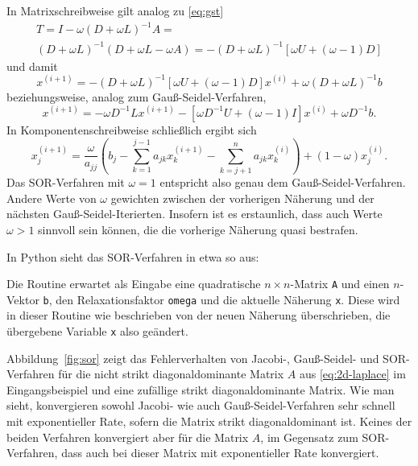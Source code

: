 In Matrixschreibweise gilt analog zu \eqref{eq:gst}
\begin{multline}
  T = I - \omega(D + \omega L)^{-1} A =\\
  (D + \omega L)^{-1}(D + \omega L - \omega A) = -(D+\omega L)^{-1}
  \left[\omega U + (\omega-1) D\right]
\end{multline}
und damit
\begin{equation}
  x^{(i+1)} = -(D+\omega L)^{-1}
  \left[\omega U + (\omega-1) D\right]x^{(i)} +
  \omega(D + \omega L)^{-1} b
\end{equation}
beziehungsweise, analog zum Gauß-Seidel-Verfahren,
\begin{equation}
  x^{(i+1)} = -\omega D^{-1}L x^{(i+1)}
  -\left[\omega D^{-1}U + (\omega-1)I\right]x^{(i)} +
  \omega D^{-1}b.
\end{equation}
In Komponentenschreibweise schließlich ergibt sich
\begin{equation}
  x_j^{(i+1)} = \frac{\omega}{a_{jj}}\left(
    b_j
    - \sum_{k=1}^{j-1} a_{jk} x_k^{(i+1)}
    - \sum_{k=j+1}^{n} a_{jk} x_k^{(i)}\right)
  + (1-\omega) x_j^{(i)}.
\end{equation}
Das SOR-Verfahren mit $\omega=1$ entspricht also genau dem
Gauß-Seidel-Verfahren. Andere Werte von $\omega$ gewichten zwischen
der vorherigen Näherung und der nächsten
Gauß-Seidel-Iterierten. Insofern ist es erstaunlich, dass auch Werte
$\omega>1$ sinnvoll sein können, die die vorherige Näherung quasi
bestrafen.

In Python sieht das SOR-Verfahren in etwa so aus:

Die Routine erwartet als Eingabe eine quadratische $n\times n$-Matrix
\lstinline!A! und einen $n$-Vektor \lstinline!b!, den
Relaxationsfaktor \lstinline!omega! und die aktuelle Näherung
\lstinline!x!. Diese wird in dieser Routine wie beschrieben von der
neuen Näherung überschrieben, die übergebene Variable \lstinline!x!
also geändert.

Abbildung~\ref{fig:sor} zeigt das Fehlerverhalten von Jacobi-,
Gauß-Seidel- und SOR-Verfahren für die nicht strikt diagonaldominante
Matrix $A$ aus \eqref{eq:2d-laplace} im Eingangsbeispiel und eine
zufällige strikt diagonaldominante Matrix. Wie man sieht, konvergieren
sowohl Jacobi- wie auch Gauß-Seidel-Verfahren sehr schnell mit
exponentieller Rate, sofern die Matrix strikt diagonaldominant ist.
Keines der beiden Verfahren konvergiert aber für die Matrix $A$, im
Gegensatz zum SOR-Verfahren, dass auch bei dieser Matrix mit
exponentieller Rate konvergiert.

